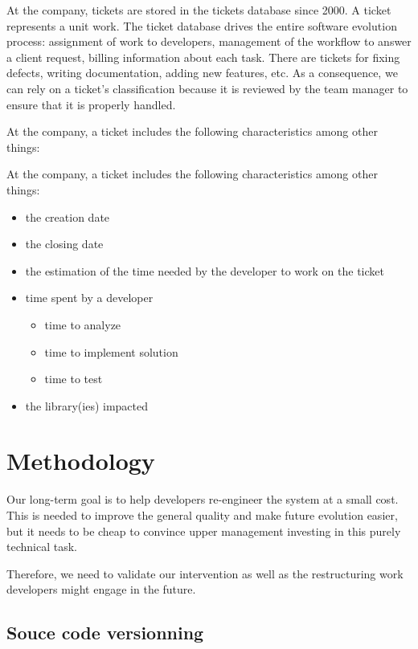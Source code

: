 \documentclass[10pt,conference]{IEEEtran}
\begin{document}
At the company, tickets are stored in the tickets database since 2000.
A ticket represents a unit work.
The ticket database drives the entire software evolution process: assignment of work to developers, management of the workflow to answer a client request, billing information about each task.
There are tickets for fixing defects, writing documentation, adding new features, etc. 
As a consequence, we can rely on a ticket's classification because it is reviewed by the team manager to ensure that it is properly handled.

At the company, a ticket includes the following characteristics among other things:


At the company, a ticket includes the following characteristics among other things:

\begin{itemize}
\item the creation date
\item the closing date
\item the estimation of the time needed by the developer to work on the ticket
\item time spent by a developer
  \begin{itemize}
  \item time to analyze
  \item time to implement solution
  \item time to test
  \end{itemize}
  \item the library(ies) impacted
\end{itemize}

\section{Methodology}
\label{sec:methodology}


Our long-term goal is to help developers re-engineer the system at a small cost.
This is needed to improve the general quality and make future evolution easier, but it needs to be cheap to convince upper management investing in this purely technical task.

Therefore, we need to validate our intervention as well as the restructuring work developers might engage in the future.

\subsection{Souce code versionning}
\end{document}
